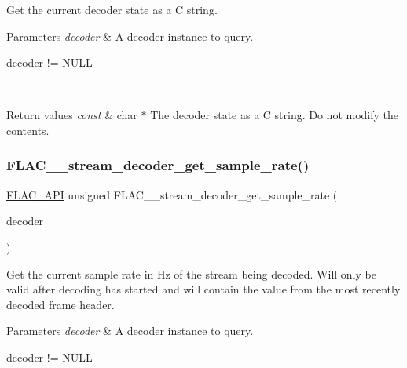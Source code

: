 Get the current decoder state as a C string.


\begin{DoxyParams}{Parameters}
{\em decoder} & A decoder instance to query.  
\begin{DoxyCode}
decoder != NULL 
\end{DoxyCode}
 \\
\hline
\end{DoxyParams}

\begin{DoxyRetVals}{Return values}
{\em const} & char $\ast$ The decoder state as a C string. Do not modify the contents. \\
\hline
\end{DoxyRetVals}
\mbox{\label{group__flac__stream__decoder_ga83f1359028e0646c1e50c1aef0d9fd6d}} 
\subsubsection{\texorpdfstring{F\+L\+A\+C\+\_\+\+\_\+stream\+\_\+decoder\+\_\+get\+\_\+sample\+\_\+rate()}{FLAC\_\_stream\_decoder\_get\_sample\_rate()}}
{\footnotesize\ttfamily \hyperlink{group__flac__export_ga56ca07df8a23310707732b1c0007d6f5}{F\+L\+A\+C\+\_\+\+A\+PI} unsigned F\+L\+A\+C\+\_\+\+\_\+stream\+\_\+decoder\+\_\+get\+\_\+sample\+\_\+rate (\begin{DoxyParamCaption}\item[{\hyperlink{zconf_8h_a2c212835823e3c54a8ab6d95c652660e}{const} \hyperlink{struct_f_l_a_c_____stream_decoder}{F\+L\+A\+C\+\_\+\+\_\+\+Stream\+Decoder} $\ast$}]{decoder }\end{DoxyParamCaption})}

Get the current sample rate in Hz of the stream being decoded. Will only be valid after decoding has started and will contain the value from the most recently decoded frame header.


\begin{DoxyParams}{Parameters}
{\em decoder} & A decoder instance to query.  
\begin{DoxyCode}
decoder != NULL 
\end{DoxyCode}
 \\
\hline
\end{DoxyParams}

